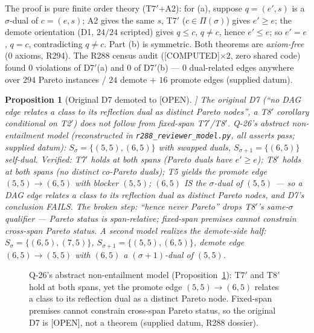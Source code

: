 \documentclass[11pt,a4paper]{article}
\newtheorem{proposition}{Proposition}
\theoremstyle{definition}
\begin{document}
The proof is pure finite order theory (T7$'$+A2): for (a), suppose
$q=(e',s)$ is a $\sigma$-dual of $c=(e,s)$; A2 gives the same $s$,
T7$'$ ($c\in\Pi(\sigma)$) gives $e'\ge e$; the demote orientation (D1,
$24/24$ scripted) gives $q\le c$, $q\neq c$, hence $e'\le e$; so
$e'=e$, $q=c$, contradicting $q\neq c$. Part (b) is symmetric. Both
theorems are \emph{axiom-free} ($0$ axioms, R294). The R288 census audit
([COMPUTED]$\times2$, zero shared code) found $0$ violations of
D7$'$(a) and $0$ of D7$'$(b) --- $0$ dual-related edges anywhere over
$294$ Pareto instances / $24$ demote $+$ $16$ promote edges (supplied
datum).

\begin{proposition}[Original D7 demoted to [OPEN]]
  \label{prop:q26}
  The original D7 (``no DAG edge relates a class to its reflection dual
  as distinct Pareto nodes'', a T8$'$ corollary conditional on T2$'$)
  does not follow from fixed-span T7$'$/T8$'$. Q-26's abstract
  non-entailment model (reconstructed in \texttt{r288\_reviewer\_model.py},
  all asserts pass; supplied datum): $S_\sigma=\{(5,5),(6,5)\}$ with
  swapped duals, $S_{\sigma+1}=\{(6,5)\}$ self-dual. Verified: T7$'$
  holds at both spans (Pareto duals have $e'\ge e$); T8$'$ holds at both
  spans (no distinct co-Pareto duals); T5 yields the promote edge
  $(5,5)\to(6,5)$ with blocker $(5,5)$; $(6,5)$ IS the $\sigma$-dual of
  $(5,5)$ --- so a DAG edge relates a class to its reflection dual as
  distinct Pareto nodes, and D7's conclusion FAILS. The broken step:
  ``hence never Pareto'' drops T8$'$'s same-$\sigma$ qualifier ---
  Pareto status is span-relative; fixed-span premises cannot constrain
  cross-span Pareto status. A second model realizes the demote-side
  half: $S_\sigma=\{(6,5),(7,5)\}$,
  $S_{\sigma+1}=\{(5,5),(6,5)\}$, demote edge $(6,5)\to(5,5)$ with
  $(6,5)$ a $(\sigma{+}1)$-dual of $(5,5)$.
\end{proposition}

\begin{figure}[t]
  \centering
  \caption{Q-26's abstract non-entailment model (Proposition~\ref{prop:q26}):
    T7$'$ and T8$'$ hold at both spans, yet the promote edge
    $(5,5)\to(6,5)$ relates a class to its reflection dual as a distinct
    Pareto node. Fixed-span premises cannot constrain cross-span Pareto
    status, so the original D7 is [OPEN], not a theorem (supplied datum,
    R288 dossier).}
  \label{fig:q26model}
\end{figure}
\end{document}
